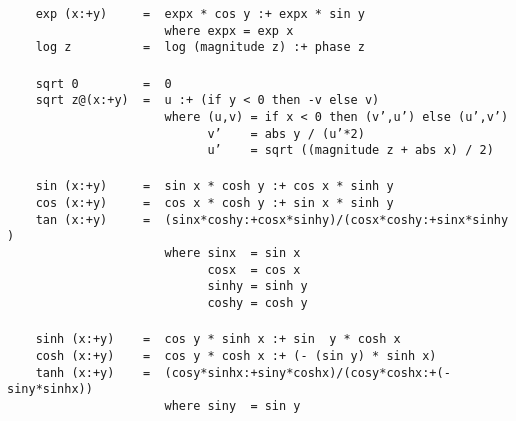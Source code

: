 \mbox{\tt \ \ \ \ exp\ (x:+y)\ \ \ \ \ =\ \ expx\ *\ cos\ y\ :+\ expx\ *\ sin\ y}\\
\mbox{\tt \ \ \ \ \ \ \ \ \ \ \ \ \ \ \ \ \ \ \ \ \ \ where\ expx\ =\ exp\ x}\\
\mbox{\tt \ \ \ \ log\ z\ \ \ \ \ \ \ \ \ \ =\ \ log\ (magnitude\ z)\ :+\ phase\ z}\\
\mbox{\tt }\\
\mbox{\tt \ \ \ \ sqrt\ 0\ \ \ \ \ \ \ \ \ =\ \ 0}\\
\mbox{\tt \ \ \ \ sqrt\ z@(x:+y)\ \ =\ \ u\ :+\ (if\ y\ <\ 0\ then\ -v\ else\ v)}\\
\mbox{\tt \ \ \ \ \ \ \ \ \ \ \ \ \ \ \ \ \ \ \ \ \ \ where\ (u,v)\ =\ if\ x\ <\ 0\ then\ (v',u')\ else\ (u',v')}\\
\mbox{\tt \ \ \ \ \ \ \ \ \ \ \ \ \ \ \ \ \ \ \ \ \ \ \ \ \ \ \ \ v'\ \ \ \ =\ abs\ y\ /\ (u'*2)}\\
\mbox{\tt \ \ \ \ \ \ \ \ \ \ \ \ \ \ \ \ \ \ \ \ \ \ \ \ \ \ \ \ u'\ \ \ \ =\ sqrt\ ((magnitude\ z\ +\ abs\ x)\ /\ 2)}\\
\mbox{\tt }\\
\mbox{\tt \ \ \ \ sin\ (x:+y)\ \ \ \ \ =\ \ sin\ x\ *\ cosh\ y\ :+\ cos\ x\ *\ sinh\ y}\\
\mbox{\tt \ \ \ \ cos\ (x:+y)\ \ \ \ \ =\ \ cos\ x\ *\ cosh\ y\ :+\ sin\ x\ *\ sinh\ y}\\
\mbox{\tt \ \ \ \ tan\ (x:+y)\ \ \ \ \ =\ \ (sinx*coshy:+cosx*sinhy)/(cosx*coshy:+sinx*sinhy)}\\
\mbox{\tt \ \ \ \ \ \ \ \ \ \ \ \ \ \ \ \ \ \ \ \ \ \ where\ sinx\ \ =\ sin\ x}\\
\mbox{\tt \ \ \ \ \ \ \ \ \ \ \ \ \ \ \ \ \ \ \ \ \ \ \ \ \ \ \ \ cosx\ \ =\ cos\ x}\\
\mbox{\tt \ \ \ \ \ \ \ \ \ \ \ \ \ \ \ \ \ \ \ \ \ \ \ \ \ \ \ \ sinhy\ =\ sinh\ y}\\
\mbox{\tt \ \ \ \ \ \ \ \ \ \ \ \ \ \ \ \ \ \ \ \ \ \ \ \ \ \ \ \ coshy\ =\ cosh\ y}\\
\mbox{\tt }\\
\mbox{\tt \ \ \ \ sinh\ (x:+y)\ \ \ \ =\ \ cos\ y\ *\ sinh\ x\ :+\ sin\ \ y\ *\ cosh\ x}\\
\mbox{\tt \ \ \ \ cosh\ (x:+y)\ \ \ \ =\ \ cos\ y\ *\ cosh\ x\ :+\ (-\ (sin\ y)\ *\ sinh\ x)}\\
\mbox{\tt \ \ \ \ tanh\ (x:+y)\ \ \ \ =\ \ (cosy*sinhx:+siny*coshx)/(cosy*coshx:+(-siny*sinhx))}\\
\mbox{\tt \ \ \ \ \ \ \ \ \ \ \ \ \ \ \ \ \ \ \ \ \ \ where\ siny\ \ =\ sin\ y}\\
